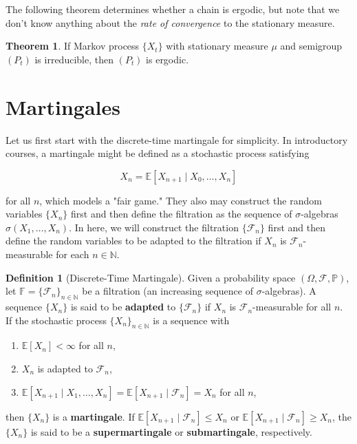 \documentclass{article}
\theoremstyle{definition}
\newtheorem{theorem}{Theorem}[section]
\theoremstyle{remark}
\theoremstyle{definition}
\newtheorem{definition}{Definition}[section]
\begin{document}
    The following theorem determines whether a chain is ergodic, but note that we don't know anything about the \textit{rate of convergence} to the stationary measure. 

    \begin{theorem}
      If Markov process $\{X_t\}$ with stationary measure $\mu$ and semigroup $(P_t)$ is irreducible, then $(P_t)$ is ergodic. 
    \end{theorem}

\section{Martingales}

  Let us first start with the discrete-time martingale for simplicity. In introductory courses, a martingale might be defined as a stochastic process satisfying 

    \[X_n = \mathbb{E}[X_{n+1} \mid X_0, \ldots, X_n]\]

  for all $n$, which models a "fair game." They also may construct the random variables $\{X_n\}$ first and then define the filtration as the sequence of $\sigma$-algebras $\sigma(X_1, \ldots, X_n)$. In here, we will construct the filtration $\{\mathcal{F}_n\}$ first and then define the random variables to be adapted to the filtration if $X_n$ is $\mathcal{F}_n$-measurable for each $n \in \mathbb{N}$. 

  \begin{definition}[Discrete-Time Martingale]
    Given a probability space $(\Omega, \mathcal{F}, \mathbb{P})$, let $\mathbb{F} = \{\mathcal{F}_n\}_{n \in \mathbb{N}}$ be a filtration (an increasing sequence of $\sigma$-algebras). A sequence $\{X_n\}$ is said to be \textbf{adapted} to $\{\mathcal{F}_n\}$ if $X_n$ is $\mathcal{F}_n$-measurable for all $n$. If the stochastic process $\{X_n\}_{n \in \mathbb{N}}$ is a sequence with 

    \begin{enumerate}
      \item $\mathbb{E}[X_n] < \infty$ for all $n$, 
      \item $X_n$ is adapted to $\mathcal{F}_n$, 
      \item $\mathbb{E}[X_{n+1} \mid X_1, \ldots, X_n] = \mathbb{E}[X_{n+1} \mid \mathcal{F}_n] = X_n$ for all $n$, 
    \end{enumerate}

    then $\{X_n\}$ is a \textbf{martingale}. If $\mathbb{E}[X_{n+1} \mid \mathcal{F}_n] \leq X_n$ or $\mathbb{E}[X_{n+1} \mid \mathcal{F}_n] \geq X_n$, the $\{X_n\}$ is said to be a \textbf{supermartingale} or \textbf{submartingale}, respectively. 
  \end{definition}
\end{document}
